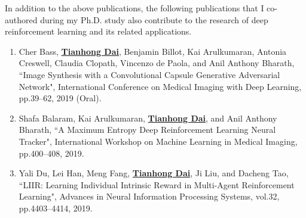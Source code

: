 In addition to the above publications, the following publications that I co-authored during my Ph.D. study also contribute to the research of deep reinforcement learning and its related applications.
\begin{enumerate}
	\item Cher Bass, \underline{\textbf{Tianhong Dai}}, Benjamin Billot, Kai Arulkumaran, Antonia Creswell, Claudia Clopath, Vincenzo de Paola, and Anil Anthony Bharath, ``Image Synthesis with a Convolutional Capsule Generative Adversarial Network", International Conference on Medical Imaging with Deep Learning, pp.39--62, 2019 (Oral).
	\item Shafa Balaram, Kai Arulkumaran, \underline{\textbf{Tianhong Dai}}, and Anil Anthony Bharath, ``A Maximum Entropy Deep Reinforcement Learning Neural Tracker", International Workshop on Machine Learning in Medical Imaging, pp.400--408, 2019.
	\item Yali Du, Lei Han, Meng Fang, \underline{\textbf{Tianhong Dai}}, Ji Liu, and Dacheng Tao, ``LIIR: Learning Individual Intrinsic Reward in Multi-Agent Reinforcement Learning", Advances in Neural Information Processing Systems, vol.32, pp.4403--4414, 2019.
\end{enumerate}